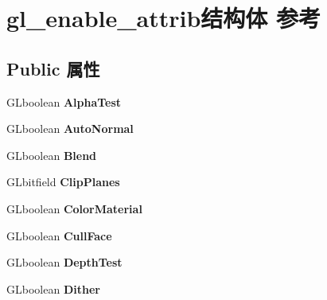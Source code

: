 \hypertarget{structgl__enable__attrib}{}\section{gl\+\_\+enable\+\_\+attrib结构体 参考}
\label{structgl__enable__attrib}
\subsection*{Public 属性}
\begin{DoxyCompactItemize}
\item 
\mbox{\label{structgl__enable__attrib_ac186a07aa6044983e38a212de6af2f33}} 
G\+Lboolean {\bfseries Alpha\+Test}
\item 
\mbox{\label{structgl__enable__attrib_a15dd4e46f37e193333f23b4864d361ce}} 
G\+Lboolean {\bfseries Auto\+Normal}
\item 
\mbox{\label{structgl__enable__attrib_a502ec8a8790d829df57d7d7bae4c73e2}} 
G\+Lboolean {\bfseries Blend}
\item 
\mbox{\label{structgl__enable__attrib_aeef8bfe54aecb05e63eb23e0ad20f8c8}} 
G\+Lbitfield {\bfseries Clip\+Planes}
\item 
\mbox{\label{structgl__enable__attrib_a90a977388dfdfe24c570d441acc0e65f}} 
G\+Lboolean {\bfseries Color\+Material}
\item 
\mbox{\label{structgl__enable__attrib_ae4313fa6ce35369bd2b800b0c52837fd}} 
G\+Lboolean {\bfseries Cull\+Face}
\item 
\mbox{\label{structgl__enable__attrib_adc956b951d149d2cba62186dbff052a5}} 
G\+Lboolean {\bfseries Depth\+Test}
\item 
\mbox{\label{structgl__enable__attrib_a13504db0ed15bb30e1684f8f1a150df9}} 
G\+Lboolean {\bfseries Dither}
\item 
\mbox{\label{structgl__enable__attrib_a1d091e7cce071ec701e2b9fdd3532da1}} 

\end{DoxyCompactItemize}
